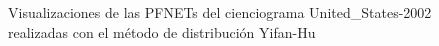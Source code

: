 \documentclass[10pt,a4paper,spanish]{article}
\numberwithin{equation}{section} %
\numberwithin{figure}{section} %
\numberwithin{table}{section} %
\begin{document}
\begin{figure}[!h]
{{            \label{q4yhus}
        }
    }
    \caption{Visualizaciones de las PFNETs del cienciograma United\_States-2002 realizadas con el método de distribución Yifan-Hu}
    \label{yhus}
\end{figure}
\end{document}
